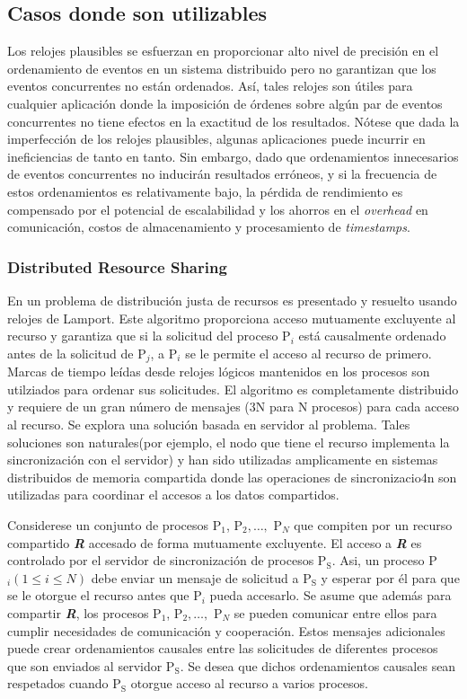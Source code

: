 \documentclass[12pt, times]{simauth}
\begin{document}
 
 
\subsection{Casos donde son utilizables}
Los relojes plausibles se esfuerzan en proporcionar alto nivel de precisión en el ordenamiento de eventos en un sistema distribuido pero no garantizan que los eventos concurrentes no están ordenados. Así, tales relojes son útiles para cualquier aplicación donde la imposición de órdenes sobre algún par de eventos concurrentes no tiene efectos en la exactitud de los resultados. Nótese que dada la imperfección de los relojes plausibles, algunas aplicaciones puede incurrir en ineficiencias de tanto en tanto. Sin embargo, dado que ordenamientos innecesarios de eventos concurrentes no inducirán resultados erróneos, y si la frecuencia de estos ordenamientos es relativamente bajo, la pérdida de rendimiento es compensado por el potencial de escalabilidad y los ahorros en el \emph{overhead} en comunicación, costos de almacenamiento y procesamiento de \emph{timestamps}.

\subsubsection{Distributed Resource Sharing}
En \cite{lamport} un problema de distribución justa de recursos es presentado y resuelto usando relojes de Lamport. Este algoritmo proporciona acceso mutuamente excluyente al recurso y garantiza que si la solicitud del proceso P$_i$ está causalmente ordenado antes de la solicitud de P$_j$, a P$_i$ se le permite el acceso al recurso de primero. Marcas de tiempo leídas desde relojes lógicos mantenidos en los procesos son utilziados para ordenar sus solicitudes. El algoritmo es completamente distribuido y requiere de un gran número de mensajes (3N para N procesos) para cada acceso al recurso. Se explora una solución basada en servidor al problema. Tales soluciones son naturales(por ejemplo, el nodo que tiene el recurso implementa la sincronización con el servidor) y han sido utilizadas amplicamente en sistemas distribuidos de memoria compartida donde las operaciones de sincronizacio4n son utilizadas para coordinar el accesos a los datos compartidos.

Considerese un conjunto de procesos P$_1$, P$_2, \dots,$ P$_N$ que compiten por un recurso compartido \textbf{\emph{R}} accesado de forma mutuamente excluyente. El acceso a \textbf{\emph{R}} es controlado por el servidor de sincronización de procesos P$_{\text{S}}$. Asi, un proceso P$_i(1 \leq i \leq N)$ debe enviar un mensaje de solicitud a P$_{\text{S}}$ y esperar por él para que se le otorgue el recurso antes que P$_i$ pueda accesarlo. Se asume que además para compartir \textbf{\emph{R}}, los procesos P$_1$, P$_2, \dots,$ P$_N$ se pueden comunicar entre ellos para cumplir necesidades de comunicación y cooperación. Estos mensajes adicionales puede crear ordenamientos causales entre las solicitudes de diferentes procesos que son enviados al servidor P$_{\text{S}}$. Se desea que dichos ordenamientos causales sean respetados cuando P$_{\text{S}}$ otorgue acceso al recurso a varios procesos.
\end{document}
